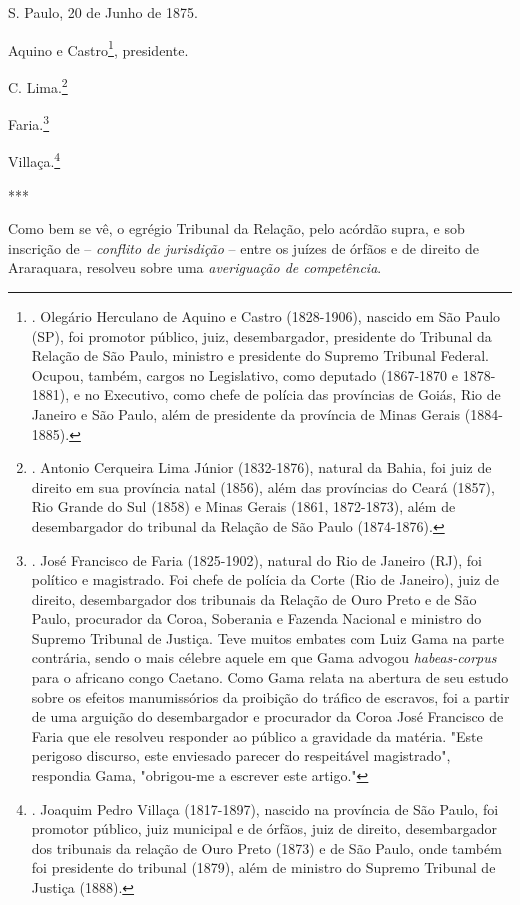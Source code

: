 S. Paulo, 20 de Junho de 1875.

Aquino e Castro\footnote{. Olegário Herculano de Aquino e Castro
  (1828-1906), nascido em São Paulo (SP), foi promotor público, juiz,
  desembargador, presidente do Tribunal da Relação de São Paulo,
  ministro e presidente do Supremo Tribunal Federal. Ocupou, também,
  cargos no Legislativo, como deputado (1867-1870 e 1878-1881), e no
  Executivo, como chefe de polícia das províncias de Goiás, Rio de
  Janeiro e São Paulo, além de presidente da província de Minas Gerais
  (1884-1885).}, presidente.

C. Lima.\footnote{. Antonio Cerqueira Lima Júnior (1832-1876), natural
  da Bahia, foi juiz de direito em sua província natal (1856), além das
  províncias do Ceará (1857), Rio Grande do Sul (1858) e Minas Gerais
  (1861, 1872-1873), além de desembargador do tribunal da Relação de São
  Paulo (1874-1876).}

Faria.\footnote{. José Francisco de Faria (1825-1902), natural do Rio de
  Janeiro (RJ), foi político e magistrado. Foi chefe de polícia da Corte
  (Rio de Janeiro), juiz de direito, desembargador dos tribunais da
  Relação de Ouro Preto e de São Paulo, procurador da Coroa, Soberania e
  Fazenda Nacional e ministro do Supremo Tribunal de Justiça. Teve
  muitos embates com Luiz Gama na parte contrária, sendo o mais célebre
  aquele em que Gama advogou \emph{habeas-corpus} para o africano congo
  Caetano. Como Gama relata na abertura de seu estudo sobre os efeitos
  manumissórios da proibição do tráfico de escravos, foi a partir de uma
  arguição do desembargador e procurador da Coroa José Francisco de
  Faria que ele resolveu responder ao público a gravidade da matéria.
  "Este perigoso discurso, este enviesado parecer do respeitável
  magistrado", respondia Gama, "obrigou-me a escrever este artigo."}

Villaça.\footnote{. Joaquim Pedro Villaça (1817-1897), nascido na
  província de São Paulo, foi promotor público, juiz municipal e de
  órfãos, juiz de direito, desembargador dos tribunais da relação de
  Ouro Preto (1873) e de São Paulo, onde também foi presidente do
  tribunal (1879), além de ministro do Supremo Tribunal de Justiça
  (1888).}

***

Como bem se vê, o egrégio Tribunal da Relação, pelo acórdão supra, e sob
inscrição de -- \emph{conflito de jurisdição} -- entre os juízes de
órfãos e de direito de Araraquara, resolveu sobre uma \emph{averiguação
de competência}.


